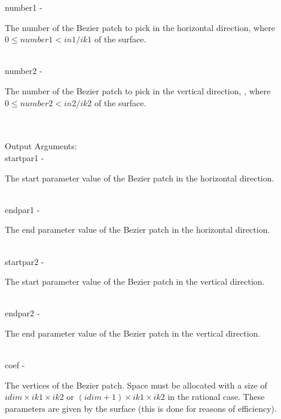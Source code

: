         \>\>    {\fov number1}\> - \>
        \begin{minipg2}
          The number of the Bezier patch to pick in the horizontal
          direction, where $0\leq number1<in1/ik1$ of the surface.
        \end{minipg2}\\[0.8ex]
        \>\>    {\fov number2}\> - \>
        \begin{minipg2}
          The number of the Bezier patch to pick in the vertical
          direction, , where $0\leq number2<in2/ik2$ of the surface.
        \end{minipg2}\\[0.8ex]
\\
        \>Output Arguments:\\
        \>\>    {\fov startpar1}        \> - \> \begin{minipg2}
                                The start parameter value of the Bezier
                                patch in the horizontal direction.
                                \end{minipg2}\\[0.8ex]
        \>\>    {\fov endpar1}  \> - \> \begin{minipg2}
                                The end parameter value of the Bezier
                                patch in the horizontal direction.
                                \end{minipg2}\\[0.8ex]
        \>\>    {\fov startpar2}        \> - \> \begin{minipg2}
                                The start parameter value of the Bezier patch                           in the vertical direction.
                                \end{minipg2}\\[0.8ex]
        \>\>    {\fov endpar2}  \> - \> \begin{minipg2}
                                The end parameter value of the Bezier patch                             in the vertical direction.
                                \end{minipg2}\\[0.8ex]
        \>\>    {\fov coef}     \> - \>
        \begin{minipg2}
          The vertices of the Bezier patch.
          Space must be allocated with a size of $idim\times ik1\times ik2$ or
          $(idim+1)\times ik1\times ik2$ in the rational case.
          These parameters are given by the surface (this is done for reasons of efficiency).
        \end{minipg2}\\
